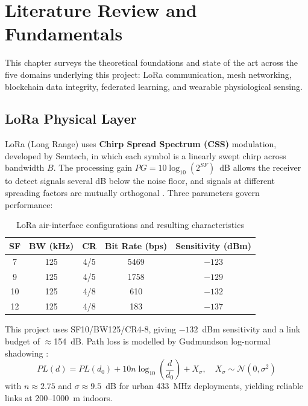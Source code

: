 \chapter{Literature Review and Fundamentals}

This chapter surveys the theoretical foundations and state of the art across the five domains underlying this project: LoRa communication, mesh networking, blockchain data integrity, federated learning, and wearable physiological sensing.

\section{LoRa Physical Layer}

LoRa (Long Range) uses \textbf{Chirp Spread Spectrum (CSS)} modulation, developed by Semtech, in which each symbol is a linearly swept chirp across bandwidth $B$. The processing gain $PG = 10\log_{10}(2^{SF})$~dB allows the receiver to detect signals several dB below the noise floor, and signals at different spreading factors are mutually orthogonal \cite{Semtech2019, Augustin2016}. Three parameters govern performance:

\begin{table}[h]
\centering
\caption{LoRa air-interface configurations and resulting characteristics}
\label{tab:lora_params}
\renewcommand{\arraystretch}{1.2}
\begin{tabular}{ccccc}
\hline
\textbf{SF} & \textbf{BW (kHz)} & \textbf{CR} & \textbf{Bit Rate (bps)} & \textbf{Sensitivity (dBm)} \\
\hline
7  & 125 & 4/5 & 5469 & $-123$ \\
9  & 125 & 4/5 & 1758 & $-129$ \\
10 & 125 & 4/8 & 610  & $-132$ \\
12 & 125 & 4/8 & 183  & $-137$ \\
\hline
\end{tabular}
\end{table}

This project uses SF10/BW125/CR4-8, giving $-132$~dBm sensitivity and a link budget of $\approx$154~dB. Path loss is modelled by Gudmundson log-normal shadowing \cite{Gudmundson1991}:
\begin{equation}
PL(d) = PL(d_0) + 10n\log_{10}\!\left(\frac{d}{d_0}\right) + X_\sigma, \quad X_\sigma \sim \mathcal{N}(0,\sigma^2)
\end{equation}
with $n \approx 2.75$ and $\sigma \approx 9.5$~dB for urban 433~MHz deployments, yielding reliable links at 200--1000~m indoors.

